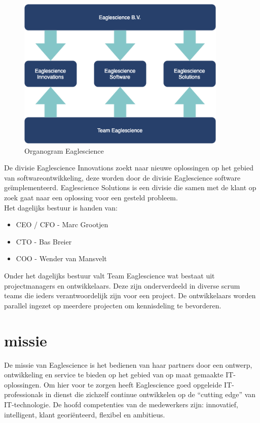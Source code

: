\begin{figure}[bth]
\myfloatalign
\includegraphics[width=10cm]{gfx/organogram}
\caption{Organogram Eaglescience}
\label{fig:Eaglescience organogram}
\end{figure}
De divisie Eaglescience Innovations zoekt naar nieuwe oplossingen op het gebied van softwareontwikkeling, deze worden door de divisie Eaglescience software geïmplementeerd.
Eaglescience Solutions is een divisie die samen met de klant op zoek gaat naar een oplossing voor een gesteld probleem.\\
Het dagelijks bestuur is handen van:
\begin{itemize}
\item CEO / CFO - Marc Grootjen
\item CTO - Bas Breier
\item COO - Wender van Mansvelt \\
\end{itemize}
Onder het dagelijks bestuur valt Team Eaglescience wat bestaat uit projectmanagers en ontwikkelaars.
Deze zijn onderverdeeld in diverse scrum teams die ieders verantwoordelijk zijn voor een project.
De ontwikkelaars worden parallel ingezet op meerdere projecten om kennisdeling te bevorderen.

\section{missie}\label{sec:missie}
De missie van Eaglescience is het bedienen van haar partners door een ontwerp, ontwikkeling en service te bieden op het gebied van op maat gemaakte IT-oplossingen.
Om hier voor te zorgen heeft Eaglescience goed opgeleide IT-professionals in dienst die zichzelf continue ontwikkelen op de “cutting edge” van IT-technologie.
De hoofd competenties van de medewerkers zijn: innovatief, intelligent, klant georiënteerd, flexibel en ambitieus.

